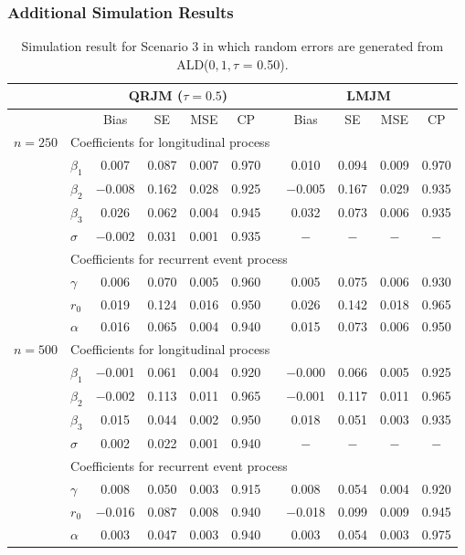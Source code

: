 \subsubsection{Additional Simulation Results}\label{sec:p2appendix_simulation}
\begin{table}[H]
\centering
\caption{Simulation result for Scenario 3 in which random errors are generated from ALD($0, 1, \tau$ = 0.50).}
\label{tab:p2simsce2}
\begin{tabular}{clccccccccc}
\hline
& & \multicolumn{4}{c}{QRJM ($\tau=0.5$)} & & \multicolumn{4}{c}{LMJM}\\
\hline
 & & Bias &SE & MSE & CP && Bias & SE & MSE & CP \\
 \hline
\multirow{9}{*}{$n=250$} &  \multicolumn{8}{l}{Coefficients for longitudinal process}\\
  & $\beta_1$ & 0.007 & 0.087 & 0.007 & 0.970 && 0.010 & 0.094 & 0.009 & 0.970 \\
  & $\beta_2$ & $-$0.008 & 0.162 & 0.028 & 0.925 && $-$0.005 & 0.167 & 0.029 & 0.935 \\
  & $\beta_3$ & 0.026 & 0.062 & 0.004 & 0.945 && 0.032 & 0.073 & 0.006 & 0.935 \\
  & $\sigma$ & $-$0.002 & 0.031 & 0.001 & 0.935 &&  $-$ & $-$ & $-$ & $-$ \\
  &  \multicolumn{8}{l}{Coefficients for recurrent event process}\\
  & $\gamma$ & 0.006 & 0.070 & 0.005 & 0.960 && 0.005 & 0.075 & 0.006 & 0.930 \\
  & $r_0$ & 0.019 & 0.124 & 0.016 & 0.950 && 0.026 & 0.142 & 0.018 & 0.965 \\
  & $\alpha$ & 0.016 & 0.065& 0.004 & 0.940 && 0.015 &0.073 & 0.006 & 0.950 \\
   \hline\hline
  \multirow{9}{*}{$n=500$} & \multicolumn{8}{l}{Coefficients for longitudinal process}\\
  & $\beta_1$ & $-$0.001 & 0.061 & 0.004 & 0.920 && $-$0.000 & 0.066 & 0.005 & 0.925 \\
  & $\beta_2$ & $-$0.002 & 0.113 & 0.011 & 0.965 && $-$0.001 & 0.117 & 0.011 & 0.965 \\
  & $\beta_3$ & 0.015 & 0.044 & 0.002 & 0.950 & & 0.018 & 0.051 & 0.003 & 0.935 \\
  & $\sigma$ & 0.002 & 0.022 & 0.001 & 0.940 &&  $-$ & $-$ & $-$ & $-$ \\
  &  \multicolumn{8}{l}{Coefficients for recurrent event process}\\
  & $\gamma$ & 0.008 & 0.050 & 0.003 & 0.915 && 0.008 & 0.054 & 0.004 & 0.920 \\
  & $r_0$ & $-$0.016 & 0.087 & 0.008 & 0.940 && $-$0.018 & 0.099 & 0.009 & 0.945 \\
  & $\alpha$ & 0.003 & 0.047 & 0.003 & 0.940 && 0.003 & 0.054 & 0.003 & 0.975 \\
   \hline
\end{tabular}
\end{table}



